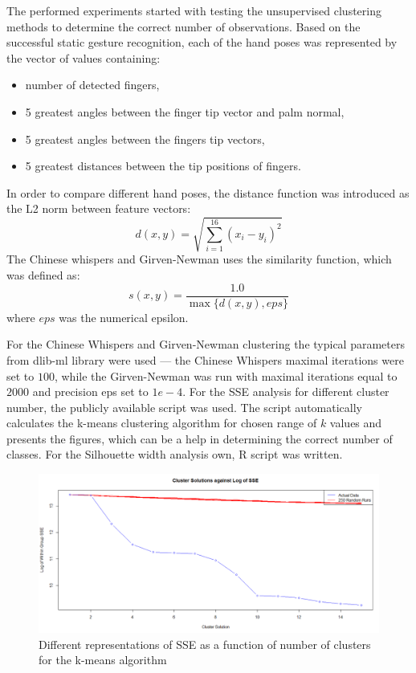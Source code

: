 The performed experiments started with testing the unsupervised clustering methods to determine the correct number of observations.
Based on the successful static gesture recognition, each of the hand poses was represented by the vector of values containing:
\begin{itemize}
\item number of detected fingers,
\item 5 greatest angles between the finger tip vector and palm normal,
\item 5 greatest angles between the fingers tip vectors,
\item 5 greatest distances between the tip positions of fingers.
\end{itemize}
In order to compare different hand poses, the distance function was introduced as the L2 norm between feature vectors:
\begin{equation}
d(x,y) = \sqrt{ \sum_{i=1}^{16} (x_i - y_i)^2 }
\end{equation}
The Chinese whispers and Girven-Newman uses the similarity function, which was defined as: 
\begin{equation}
s(x,y) = \frac{1.0}{ \max{\{d(x,y), eps\}}}
\end{equation}
where $eps$ was the numerical epsilon.

For the Chinese Whispers and Girven-Newman clustering the typical parameters from dlib-ml library were used --- the Chinese Whispers maximal iterations were set to $100$, while the Girven-Newman was run with maximal iterations equal to $2000$ and precision eps set to $1e-4$.
For the SSE analysis for different cluster number, the publicly available script was used\cite{SSE}. 
The script automatically calculates the k-means clustering algorithm for chosen range of $k$ values and presents the figures, which can be a help in determining the correct number of classes.
For the Silhouette width analysis own, R script was written.



\begin{figure}[htp!]
\centering
 \includegraphics[width=1.0\columnwidth]{figures/SSE1.png}
 \caption{Different representations of SSE as a function of number of clusters for the k-means algorithm}
 \label{dynamicSSE}
\end{figure}


